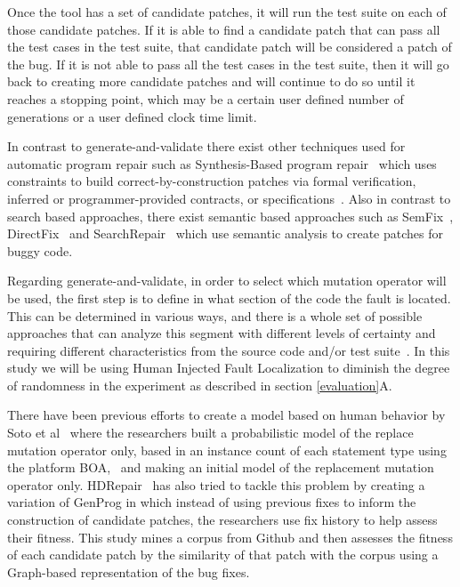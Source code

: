 \documentclass[conference]{IEEEtran}
\begin{document}
Once the tool has a set of candidate patches, it will run the test suite on each 
of those candidate patches. If it is able to find a candidate patch that can 
pass all the test cases in the test suite, that candidate patch will be 
considered a patch of the bug. If it is not able to pass all the test cases in 
the test suite, then it will go back to creating more candidate patches and will 
continue to do so until it reaches a stopping point, which may be a certain user 
defined number of generations or a user defined clock time limit.


In contrast to generate-and-validate there exist other techniques used for 
automatic program repair such as Synthesis-Based program 
repair~\cite{jin11,pei14} which uses constraints to build 
correct-by-construction patches via formal verification, inferred or 
programmer-provided contracts,
or specifications~\cite{smith15}. Also in contrast to search based approaches, there exist semantic based approaches such as SemFix~\cite{nguyen13}, DirectFix~\cite{mechtaev15} and SearchRepair~\cite{ke15} which use semantic analysis to create patches for buggy code.

Regarding generate-and-validate, in
order to select which mutation operator will be used, the 
first step is to define in what section of the code the fault is located. This can be determined in various ways, and 
there is 
a whole set of
possible approaches that can analyze this segment with different levels of certainty and 
requiring different characteristics from the source code and/or test 
suite~\cite{Jones05,Jones02,Chen02,legoues12,Qi13,Qi2013,Abreu07,wong09}. In this study we will be using Human Injected Fault Localization to diminish the degree of randomness in the experiment as described in section \ref{evaluation}A.

There have been previous efforts to create a model based on human behavior by Soto et al~\cite{Soto15} 
where the researchers built a probabilistic model of the replace mutation 
operator only, based in 
an instance count of each statement type using the platform 
BOA,~\cite{dyer2013} and making an initial model of the replacement mutation 
operator only. HDRepair~\cite{xuan16} has also tried to tackle this problem by 
creating a variation of GenProg in which instead of using previous fixes to
inform the construction of candidate patches, the researchers use fix history
to help assess their fitness. This study mines a corpus from Github and then assesses the fitness of each candidate patch by the similarity of that patch with the corpus using a Graph-based representation of the bug fixes.
\end{document}
